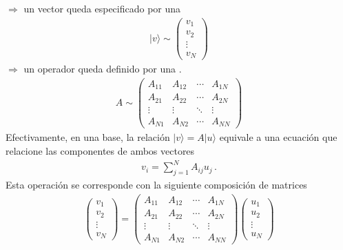 \documentclass[letterpaper,10pt,english]{jupyterBook}
\newcommand{\ket}[1]{|#1\rangle}
\begin{document}
\sphinxAtStartPar
\(\Rightarrow \)  un vector queda especificado por una 
\begin{equation*}
\begin{split}
\ket{v} \sim \begin{pmatrix} v_1 \\ v_2\\ \vdots \\ v_N\end{pmatrix}
\end{split}
\end{equation*}
\sphinxAtStartPar
\(\Rightarrow \)  un operador queda definido por una .
\begin{equation*}
\begin{split}
A \sim \begin{pmatrix} 
A_{11} & A_{12} & \cdots & A_{1N} \\
A_{21} & A_{22} & \cdots & A_{2N} \\
\vdots & \vdots &  \ddots      & \vdots \\
A_{N1} & A_{N2} &    \cdots    & A_{NN}
\end{pmatrix}
\end{split}
\end{equation*}
\sphinxAtStartPar
Efectivamente, en una base, la relación \(\ket{v} = A\ket{u}\) equivale a una ecuación que relacione las componentes de ambos vectores
\begin{equation*}
\begin{split}
v_i = \sum_{j=1}^N A_{ij} u_j  \, .
\end{split}
\end{equation*}
\sphinxAtStartPar
Esta operación se corresponde con la siguiente composición de matrices
\begin{equation*}
\begin{split}
\begin{pmatrix}
v_1 \\ v_2 \\ \vdots \\ v_N \end{pmatrix} =  \begin{pmatrix} 
A_{11} & A_{12} & \cdots & A_{1N} \\
A_{21} & A_{22} & \cdots & A_{2N} \\
\vdots & \vdots &  \ddots      & \vdots \\
A_{N1} & A_{N2} &    \cdots    & A_{NN}
\end{pmatrix}
 \begin{pmatrix} 
u_1 \\ u_2 \\ \vdots \\ u_N\end{pmatrix}
\end{split}
\end{equation*}
\end{document}
